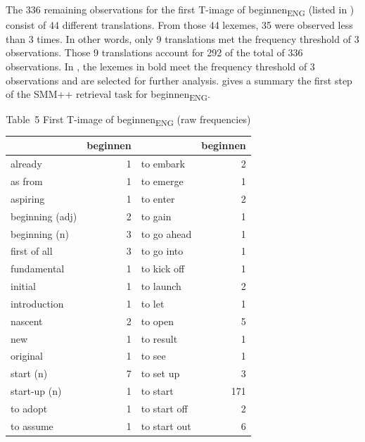 The 336 remaining observations for the first T-image of beginnen\textsubscript{ENG} (listed in ) consist of 44 different translations. From those 44 lexemes, 35 were observed less than 3 times. In other words, only 9 translations met the frequency threshold of 3 observations. Those 9 translations account for 292 of the total of 336 observations. In , the lexemes in bold meet the frequency threshold of 3 observations and are selected for further analysis.  gives a summary the first step of the SMM++ retrieval task for beginnen\textsubscript{ENG}.


\begin{table}
\caption{Table~5  First T-image of beginnen\textsubscript{ENG} (raw frequencies)}
\begin{tabular}{lr@{\hspace{5em}}lr} 
\lsptoprule
&  {beginnen}               &             & beginnen     \\\midrule      
{already} &  1            &             {to} {embark} &  2\\
{as} {from} &  1          &           {to} {emerge} &  1\\
{aspiring} &  1           &            {to} {enter} &  2\\
{beginning} {(adj)} &  2  &   {to} {gain} &  1\\
{beginning} {(n)} &  {3}  &   {to} {go} {ahead} &  1\\
{first} {of} {all} &  {3} &  {to} {go} {into} &  1\\
{fundamental} &  1        &         {to} {kick} {off} &  1\\
{initial} &  1            &             {to} {launch} &  2\\
{introduction} &  1       &        {to} {let} &  1\\
{nascent} &  2            &             {to} {open} &  {5}\\
{new} &  1                &                 {to} {result} &  1\\
{original} &  1           &            {to} {see} &  1\\
{start} {(n)} &  {7}      &       {to} {set} {up} &  {3}\\
{start-up} {(n)} &  1     &      {to} {start} &  {171}\\
{to} {adopt} &  1         &          {to} {start} {off} &  2\\
{to} {assume} &  1        &         {to} {start} {out} &  {6}\\

\end{tabular}
\end{table}
